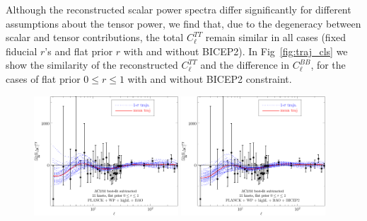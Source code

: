 \documentclass[11pt]{article}
\def \halffigwidth{0.48\textwidth}
\begin{document}
Although the reconstructed scalar power spectra differ significantly for different assumptions about the tensor power, we find that, due to the degeneracy between scalar and tensor contributions, the total $C_\ell^{TT}$ remain similar in all cases (fixed fiducial $r$'s and flat prior $r$ with and without BICEP2). In Fig~\ref{fig:traj_cls} we show the similarity of the reconstructed $C_\ell^{TT}$ and the difference in $C_{\ell}^{BB}$, for the cases of flat prior $0\le r \le 1$ with and without BICEP2 constraint. 

\begin{figure}
\includegraphics[width = \halffigwidth]{nobicep_spline0_p11_dclTT_trajs.pdf}%
\includegraphics[width = \halffigwidth]{spline0_p11_dclTT_trajs.pdf}

\end{figure}
\end{document}
